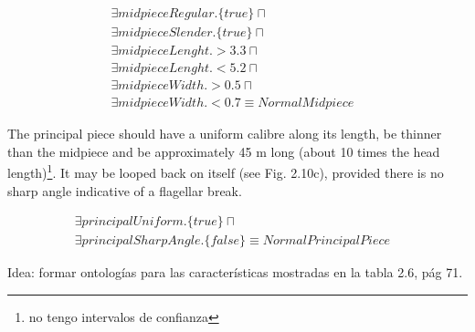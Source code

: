 \documentclass{article}
\begin{document}
\begin{align*}
\exists midpieceRegular.\{true\} \sqcap &\\
\exists midpieceSlender.\{true\} \sqcap &\\
\exists midpieceLenght.>3.3 \sqcap &\\
\exists midpieceLenght.<5.2 \sqcap &\\
\exists midpieceWidth.>0.5 \sqcap &\\
\exists midpieceWidth.<0.7 \equiv NormalMidpiece
\end{align*}

The principal piece should have a uniform calibre along its length, be thinner
than the midpiece and be approximately 45 m long (about 10 times the head
length)\footnote{no tengo intervalos de confianza}. 
It may be looped back on itself (see Fig. 2.10c), provided there is no
sharp angle indicative of a flagellar break.

\begin{align*}
\exists principalUniform.\{true\} \sqcap &\\
\exists principalSharpAngle.\{false\} \equiv NormalPrincipalPiece
\end{align*}

Idea: formar ontologías para las características mostradas en la tabla 2.6, pág 71.
\end{document}
